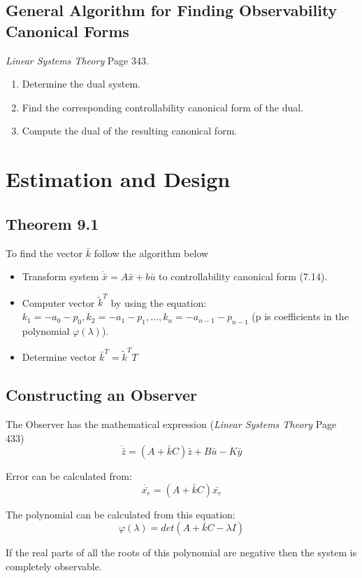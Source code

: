 \documentclass[12pt]{article}
\begin{document}
\subsection*{General Algorithm for Finding Observability Canonical Forms}
{\em Linear Systems Theory} Page 343.
\begin{enumerate}
	\item Determine the dual system.
	\item Find the corresponding controllability canonical form of the dual.
	\item Compute the dual of the resulting canonical form.
\end{enumerate}

\newpage
\section*{Estimation and Design}
\subsection*{Theorem 9.1}
To find the vector $\bar{k}$ follow the algorithm below
\begin{itemize}
	\item Transform system $\dot{\bar{x}}=A\bar{x}+b\bar{u}$ to controllability canonical form (7.14).
	\item Computer vector $\tilde{k}^T$ by using the equation: $k_1=-a_0-p_0, k_2=-a_1-p_1, \dots, k_n=-a_{n-1}-p_{n-1}$ (p is coefficients in the polynomial $\varphi(\lambda)$).
	\item Determine vector $\bar{k}^T=\tilde{k}^TT$
\end{itemize}

\subsection*{Constructing an Observer}
The Observer has the mathematical expression ({\em Linear Systems Theory} Page 433)
$$\dot{\bar{z}}=(A+\bar{k}C)\bar{z}+B\bar{u}-K\bar{y}$$

\noindent
Error can be calculated from:
$$\dot{\bar{x_e}}=(A+\bar{k}C)\bar{x_e}$$

\noindent
The polynomial can be calculated from this equation:
$$\varphi(\lambda)=det(A+\bar{k}C-\lambda I)$$

\noindent
If the real parts of all the roots of this polynomial are negative then the system is completely observable. 
\end{document}
